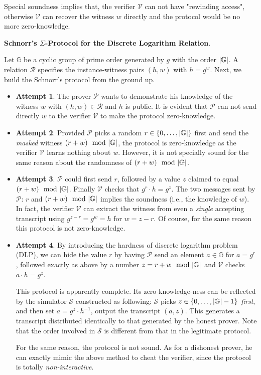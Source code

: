 \documentclass{article}
\begin{document}
\begin{remark}
Special soundness implies that, the verifier $\mathcal{V}$ can not have "rewinding access", otherwise $\mathcal{V}$ can recover the witness $w$ directly and the protocol would be no more zero-knowledge. 
\end{remark}

\textbf{Schnorr's $\Sigma$-Protocol for the Discrete Logarithm Relation}. 

Let $\mathbb{G}$ be a cyclic group of prime order generated by $g$ with the order $\abs{\mathbb{G}}$. A relation $\mathcal{R}$ specifies the instance-witness pairs $(h, w)$ with $h = g^w$. Next, we build the Schnorr's protocol from the ground up.

\begin{itemize}
\item \textbf{Attempt 1}. The prover $\mathcal{P}$ wants to demonstrate his knowledge of the witness $w$ with $(h, w) \in \mathcal{R}$ and $h$ is public. It is evident that $\mathcal{P}$ can not send directly $w$ to the verifier $\mathcal{V}$ to make the protocol zero-knowledge. 
\item \textbf{Attempt 2}. Provided $\mathcal{P}$ picks a random $r \in \left\{ 0, \dots, \abs{\mathbb{G}} \right\}$ first and send the \textit{masked} witness $(r + w) \mod \abs{\mathbb{G}}$, the protocol is zero-knowledge as the verifier $\mathcal{V}$ learns nothing about $w$. However, it is not specially sound for the same reason about the randomness of $(r + w) \mod \abs{\mathbb{G}}$. 
\item \textbf{Attempt 3}. $\mathcal{P}$ could first send $r$, followed by a value $z$ claimed to equal $(r + w) \mod \abs{\mathbb{G}}$. Finally $\mathcal{V}$ checks that $g^r \cdot h = g^z$. The two messages sent by $\mathcal{P}$: $r$ and $(r + w) \mod \abs{\mathbb{G}}$ implies the soundness (i.e., the knowledge of $w$). In fact, the verifier $\mathcal{V}$ can extract the witness from even a \textit{single} accepting transcript using $g^{z - r} = g^w = h$ for $w = z-r$. Of course, for the same reason this protocol is not zero-knowledge. 
\item \textbf{Attempt 4}. By introducing the hardness of discrete logarithm problem (DLP), we can hide the value $r$ by having $\mathcal{P}$ send an element $a \in \mathbb{G}$ for $a = g^r$, followed exactly as above by a number $z = r + w \mod \abs{\mathbb{G}}$ and $\mathcal{V}$ checks $a \cdot h = g^z$. 

This protocol is apparently complete. Its zero-knowledge-ness can be reflected by the simulator $\mathcal{S}$ constructed as following: $\mathcal{S}$ picks $z \in \left\{ 0, \dots, \abs{\mathbb{G}}-1 \right\}$ \textit{first}, and then set $a = g^z \cdot h^{-1}$, output the transcript $(a, z)$. This generates a transcript distributed identically to that generated by the honest prover. Note that the order involved in $\mathcal{S}$ is different from that in the legitimate protocol.

For the same reason, the protocol is not sound. As for a dishonest prover, he can exactly mimic the above method to cheat the verifier, since the protocol is totally \textit{non-interactive}. 

\end{itemize}
\end{document}
